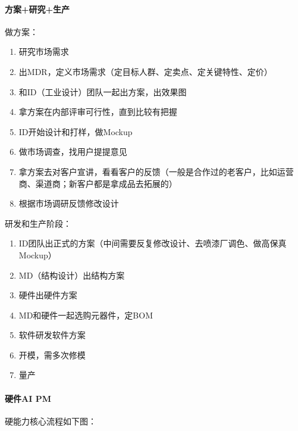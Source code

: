 \documentclass[letterpaper,11pt,english]{sphinxmanual}
\begin{document}
\paragraph{方案+研究+生产}
\label{\detokenize{chapter_project/AI_hardware:id1}}
做方案：
\begin{enumerate}
%
\item {} 
研究市场需求

\item {} 
出MDR，定义市场需求（定目标人群、定卖点、定关键特性、定价）

\item {} 
和ID（工业设计）团队一起出方案，出效果图

\item {} 
拿方案在内部评审可行性，直到比较有把握

\item {} 
ID开始设计和打样，做Mockup

\item {} 
做市场调查，找用户提提意见

\item {} 
拿方案去对客户宣讲，看看客户的反馈（一般是合作过的老客户，比如运营商、渠道商；新客户都是拿成品去拓展的）

\item {} 
根据市场调研反馈修改设计

\end{enumerate}

研发和生产阶段：
\begin{enumerate}
%
\item {} 
ID团队出正式的方案（中间需要反复修改设计、去喷漆厂调色、做高保真Mockup）

\item {} 
MD（结构设计）出结构方案

\item {} 
硬件出硬件方案

\item {} 
MD和硬件一起选购元器件，定BOM

\item {} 
软件研发软件方案

\item {} 
开模，需多次修模

\item {} 
量产

\end{enumerate}


\paragraph{硬件AI PM}
\label{\detokenize{chapter_project/AI_hardware:ai-pm}}
硬能力核心流程如下图：
\end{document}
